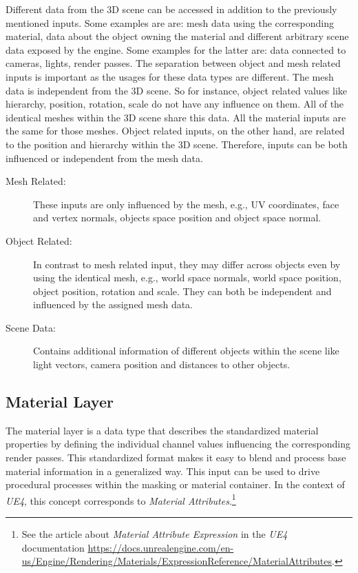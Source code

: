 		Different data from the 3D scene can be accessed in addition to the previously mentioned inputs. Some examples are are: mesh data using the corresponding material, data about the object owning the material and different arbitrary scene data exposed by the engine. Some examples for the latter are: data connected to cameras, lights, render passes. The separation between object and mesh related inputs is important as the usages for these data types are different. The mesh data is independent from the 3D scene. So for instance, object related values like hierarchy, position, rotation, scale do not have any influence on them. All of the identical meshes within the 3D scene share this data. All the material inputs are the same for those meshes. Object related inputs, on the other hand, are related to the position and hierarchy within the 3D scene. Therefore, inputs can be both influenced or independent from the mesh data. 
		
		\begin{description}
			\item [Mesh Related:] These inputs are only influenced by the mesh, e.g., UV coordinates, face and vertex normals, objects space position and object space normal. 	
			\item [Object Related:] In contrast to mesh related input, they may differ across objects even by using the identical mesh, e.g., world space normals, world space position, object position, rotation and scale. They can both be independent and influenced by the assigned mesh data. 
			\item [Scene Data:] Contains additional information of different objects within the scene like light vectors, camera position and distances to other objects. 
		\end{description}

	\subsection{Material Layer}

		The material layer is a data type that describes the standardized material properties by defining the individual channel values influencing the corresponding render passes. This standardized format makes it easy to blend and process base material information in a generalized way. This input can be used to drive procedural processes within the masking or material container. In the context of \emph{UE4}, this concept corresponds to \emph{Material Attributes}.\footnote{See the article about \emph{Material Attribute Expression} in the  \emph{UE4} documentation \url{https://docs.unrealengine.com/en-us/Engine/Rendering/Materials/ExpressionReference/MaterialAttributes}.} 
 
